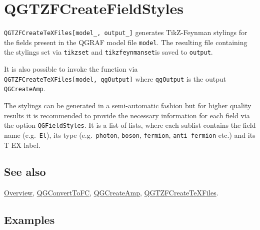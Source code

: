 \documentclass[../FeynHelpersManual.tex]{subfiles}
\begin{document}
\hypertarget{qgtzfcreatefieldstyles}{
\section{QGTZFCreateFieldStyles}\label{qgtzfcreatefieldstyles}}

\texttt{QGTZFCreateTeXFiles[\allowbreak{}model_,\ \allowbreak{}output_]}
generates TikZ-Feynman stylings for the fields present in the QGRAF
model file \texttt{model}. The resulting file containing the stylings
set via \texttt{tikzset} and \texttt{tikzfeynmanset}is saved to
\texttt{output}.

It is also possible to invoke the function via
\texttt{QGTZFCreateTeXFiles[\allowbreak{}model,\ \allowbreak{}qgOutput]}
where \texttt{qgOutput} is the output \texttt{QGCreateAmp}.

The stylings can be generated in a semi-automatic fashion but for higher
quality results it is recommended to provide the necessary information
for each field via the option \texttt{QGFieldStyles}. It is a list of
lists, where each sublist contains the field name (e.g.~\texttt{El}),
its type (e.g.~\texttt{photon}, \texttt{boson}, \texttt{fermion},
\texttt{anti fermion} etc.) and its T EX label.

\subsection{See also}

\hyperlink{toc}{Overview}, \hyperlink{qgconverttofc}{QGConvertToFC},
\hyperlink{qgcreateamp}{QGCreateAmp},
\hyperlink{qgtzfcreatetexfiles}{QGTZFCreateTeXFiles}.

\subsection{Examples}

\begin{Shaded}
\begin{Highlighting}[]
\ExtensionTok{=} \OperatorTok{[\{}\OperatorTok{,} \OperatorTok{,} 
     \OperatorTok{,} \OperatorTok{,} \OperatorTok{\}]}\NormalTok{;}
\end{Highlighting}
\end{Shaded}

\begin{Shaded}
\begin{Highlighting}[]
\ExtensionTok{=}\OperatorTok{[}\OperatorTok{,} \OperatorTok{,} 
\OtherTok{{-}\textgreater{}} \OperatorTok{\{\{}\OperatorTok{,} \OperatorTok{,} \SpecialCharTok{\textbackslash{}\textbackslash{}}\OperatorTok{\}\}]}\NormalTok{;}
\end{Highlighting}
\end{Shaded}
\end{document}
